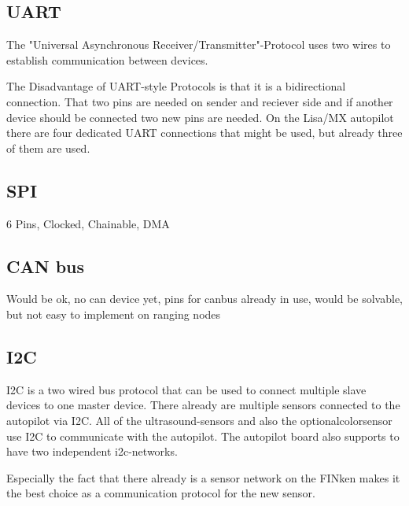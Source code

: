 \subsection{UART}
The "Universal Asynchronous Receiver/Transmitter"-Protocol uses two wires to establish communication between devices.
\cite{wingen_automatic_2004}

The Disadvantage of UART-style Protocols is that it is a bidirectional connection.
That two pins are needed on sender and reciever side and if another device should be connected two new pins are needed.
On the Lisa/MX autopilot there are four dedicated UART connections that might be used, but already three of them are used.

\subsection{SPI}
6 Pins, Clocked, Chainable, DMA

\subsection{CAN bus}
Would be ok, no can device yet, pins for canbus already in use, would be solvable, but not easy to implement on ranging nodes

\subsection{I2C}

I2C is a two wired bus protocol that can be used to connect multiple slave devices to one master device.
There already are multiple sensors connected to the autopilot via I2C.
All of the ultrasound-sensors and also the optionalcolorsensor use I2C to communicate with the autopilot.
The autopilot board also supports to have two independent i2c-networks.

Especially the fact that there already is a sensor network on the FINken makes it the best choice as a communication protocol for the new sensor.


